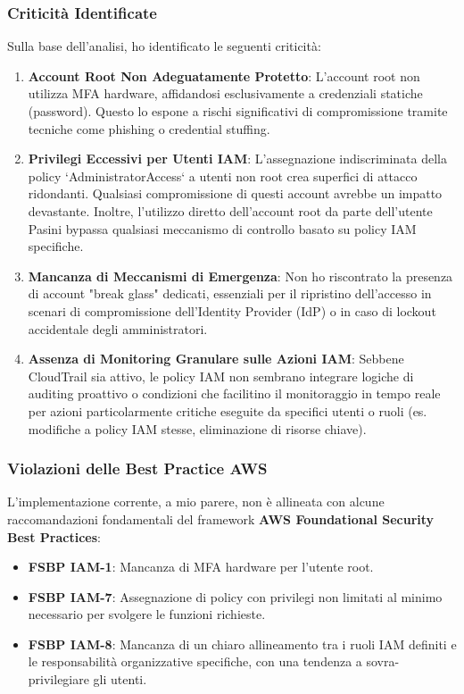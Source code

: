\subsubsection{Criticità Identificate}
Sulla base dell'analisi, ho identificato le seguenti criticità:
\begin{enumerate}
    \item \textbf{Account Root Non Adeguatamente Protetto}: L'account root non utilizza MFA hardware, affidandosi esclusivamente a credenziali statiche (password)\cite{ref3}. Questo lo espone a rischi significativi di compromissione tramite tecniche come phishing o credential stuffing.
    \item \textbf{Privilegi Eccessivi per Utenti IAM}: L'assegnazione indiscriminata della policy `AdministratorAccess` a utenti non root crea superfici di attacco ridondanti. Qualsiasi compromissione di questi account avrebbe un impatto devastante. Inoltre, l'utilizzo diretto dell'account root da parte dell'utente Pasini bypassa qualsiasi meccanismo di controllo basato su policy IAM specifiche\cite{ref2}.
    \item \textbf{Mancanza di Meccanismi di Emergenza}: Non ho riscontrato la presenza di account "break glass" dedicati, essenziali per il ripristino dell'accesso in scenari di compromissione dell'Identity Provider (IdP) o in caso di lockout accidentale degli amministratori\cite{ref4}.
    \item \textbf{Assenza di Monitoring Granulare sulle Azioni IAM}: Sebbene CloudTrail sia attivo, le policy IAM non sembrano integrare logiche di auditing proattivo o condizioni che facilitino il monitoraggio in tempo reale per azioni particolarmente critiche eseguite da specifici utenti o ruoli (es. modifiche a policy IAM stesse, eliminazione di risorse chiave)\cite{ref7}.
\end{enumerate}

\subsubsection{Violazioni delle Best Practice AWS}
L'implementazione corrente, a mio parere, non è allineata con alcune raccomandazioni fondamentali del framework \textbf{AWS Foundational Security Best Practices}:
\begin{itemize}
    \item \textbf{FSBP IAM-1}: Mancanza di MFA hardware per l'utente root\cite{ref3}.
    \item \textbf{FSBP IAM-7}: Assegnazione di policy con privilegi non limitati al minimo necessario per svolgere le funzioni richieste\cite{ref5}.
    \item \textbf{FSBP IAM-8}: Mancanza di un chiaro allineamento tra i ruoli IAM definiti e le responsabilità organizzative specifiche, con una tendenza a sovra-privilegiare gli utenti\cite{ref2}.
\end{itemize}

